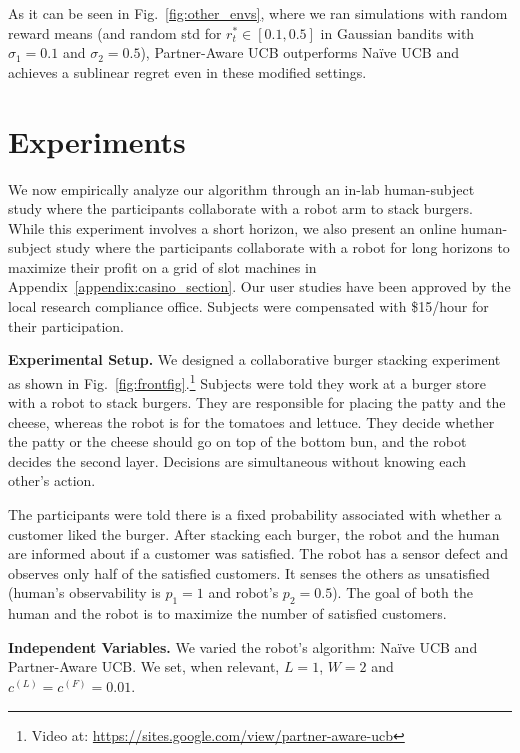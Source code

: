 \documentclass[letterpaper]{article} %
\theoremstyle{definition}
\begin{document}
As it can be seen in Fig.~\ref{fig:other_envs}, where we ran simulations with random reward means (and random std for $r^*_t\in[0.1,0.5]$ in Gaussian bandits with $\sigma_1=0.1$ and $\sigma_2=0.5$), Partner-Aware UCB outperforms Na\"ive UCB and achieves a sublinear regret even in these modified settings.





\section{Experiments}
\label{sec:exp}

We now empirically analyze our algorithm through an in-lab human-subject study where the participants collaborate with a robot arm to stack burgers. While this experiment involves a short horizon, we also present an online human-subject study where the participants collaborate with a robot for long horizons to maximize their profit on a grid of slot machines in Appendix~\ref{appendix:casino_section}. Our user studies have been approved by the local research compliance office. Subjects were compensated with \$15/hour for their participation.




\smallskip
\noindent\textbf{Experimental Setup.} We designed a collaborative burger stacking experiment as shown in Fig.~\ref{fig:frontfig}.\footnote{Video at: \url{https://sites.google.com/view/partner-aware-ucb}}
Subjects were told they work at a burger store with a robot to stack burgers. They are responsible for placing the patty and the cheese, whereas the robot is for the tomatoes and lettuce. They decide whether the patty or the cheese should go on top of the bottom bun, and the robot decides the second layer. Decisions are simultaneous without knowing each other's action.

The participants were told there is a fixed probability associated with whether a customer liked the burger. After stacking each burger, the robot and the human are informed about if a customer was satisfied. The robot has a sensor defect and observes only half of the satisfied customers. It senses the others as unsatisfied (human's observability is $p_1\!=\!1$ and robot's $p_2\!=\!0.5$). The goal of both the human and the robot is to maximize the number of satisfied customers.

\smallskip
\noindent\textbf{Independent Variables.} We varied the robot's algorithm: Na\"ive UCB and Partner-Aware UCB. We set, when relevant, $L=1$, $W=2$ and $c^{(L)}=c^{(F)}=0.01$.
\end{document}
